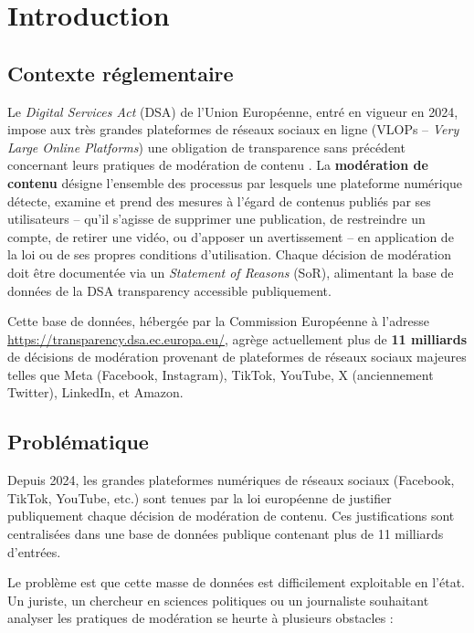 \documentclass[10pt,twocolumn,a4paper]{article}
\begin{document}
\section{Introduction}

\subsection{Contexte réglementaire}

Le \textit{Digital Services Act} (DSA) de l'Union Européenne, entré en vigueur en 2024, impose aux très grandes plateformes de réseaux sociaux en ligne (VLOPs -- \textit{Very Large Online Platforms}) une obligation de transparence sans précédent concernant leurs pratiques de modération de contenu \cite{dsa2022}. La \textbf{modération de contenu} désigne l'ensemble des processus par lesquels une plateforme numérique détecte, examine et prend des mesures à l'égard de contenus publiés par ses utilisateurs -- qu'il s'agisse de supprimer une publication, de restreindre un compte, de retirer une vidéo, ou d'apposer un avertissement -- en application de la loi ou de ses propres conditions d'utilisation. Chaque décision de modération doit être documentée via un \textit{Statement of Reasons} (SoR), alimentant la base de données de la DSA transparency accessible publiquement.

Cette base de données, hébergée par la Commission Européenne à l'adresse \url{https://transparency.dsa.ec.europa.eu/}, agrège actuellement plus de \textbf{11 milliards} de décisions de modération provenant de plateformes de réseaux sociaux majeures telles que Meta (Facebook, Instagram), TikTok, YouTube, X (anciennement Twitter), LinkedIn, et Amazon.

\subsection{Problématique}

Depuis 2024, les grandes plateformes numériques de réseaux sociaux (Facebook, TikTok, YouTube, etc.) sont tenues par la loi européenne de justifier publiquement chaque décision de modération de contenu. Ces justifications sont centralisées dans une base de données publique contenant plus de 11 milliards d'entrées.

Le problème est que cette masse de données est difficilement exploitable en l'état. Un juriste, un chercheur en sciences politiques ou un journaliste souhaitant analyser les pratiques de modération se heurte à plusieurs obstacles :
\end{document}
